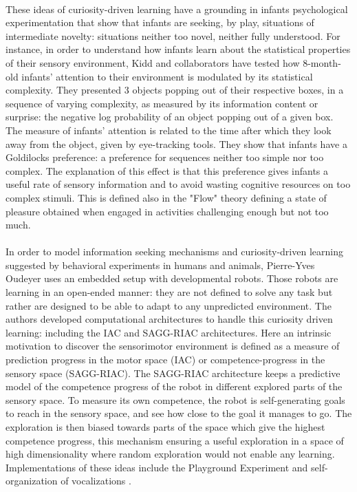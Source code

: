 \documentclass[12pt]{article}
\begin{document}
		\paragraph{}
		These ideas of curiosity-driven learning have a grounding in infants psychological experimentation \cite{forestierworkshop} that show that infants are seeking, by play,
		situations of intermediate novelty: situations neither too novel, neither fully understood.
		For instance, in order to understand how infants learn about the statistical properties of their sensory environment, 
		Kidd and collaborators \cite{kidd} have tested 
		how 8-month-old infants' attention to their environment is modulated by its statistical complexity.			
		They presented 3 objects popping out of their respective boxes, in a sequence of varying complexity, 
		as measured by its information content or surprise: the negative log probability of an object popping out of a given box.
		The measure of infants' attention is related to the time after which they look away from the object, given by eye-tracking tools.						
		They show that infants have a Goldilocks preference: a preference for sequences neither too simple nor too complex.				
		The explanation of this effect is that this preference gives infants a useful rate of sensory information 
		and to avoid wasting cognitive resources on too complex stimuli.		
		This is defined also in the "Flow" theory \cite{flow} defining a state of pleasure obtained when engaged in activities challenging enough but not too much.
		
		\paragraph{}%
		In order to model information seeking mechanisms and curiosity-driven learning suggested by behavioral experiments in humans and animals,
		Pierre-Yves Oudeyer uses an embedded setup with developmental robots. Those robots are learning in an open-ended manner: they are not defined to solve any task but rather are designed 
		to be able to adapt to any unpredicted environment.		
		The authors developed computational architectures to handle this curiosity driven learning: including the IAC \cite{oudeyer_intrinsic_2007} 
		and SAGG-RIAC \cite{baranes2010intrinsically} architectures.
		Here an intrinsic motivation to discover the sensorimotor environment is defined as a measure of prediction progress in the motor space (IAC) 
		or competence-progress in the sensory space (SAGG-RIAC).
		The SAGG-RIAC architecture keeps a predictive model of the competence progress of the robot in different explored parts of the sensory space.
		To measure its own competence, the robot is self-generating goals to reach in the sensory space, and see how close to the goal it manages to go.
		The exploration is then biased towards parts of the space which give the highest competence progress, this mechanism ensuring a useful exploration in a space of high dimensionality where random exploration would not enable any learning. 			
		Implementations of these ideas include the Playground Experiment \cite{oudeyer_intrinsic_2007} and self-organization of vocalizations \cite{moulin-frier_self-organization_2014}.
		
\end{document}
